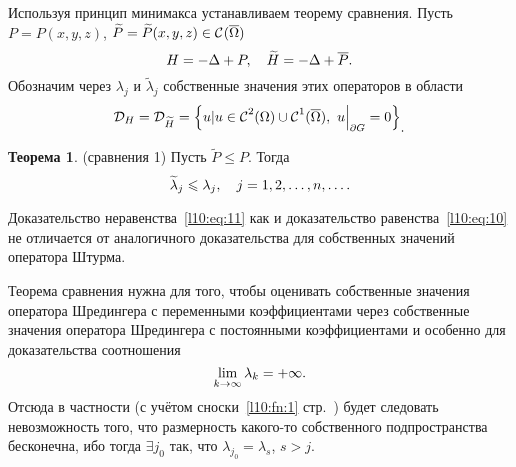 \documentclass[12pt,a4paper,openany,fleqn]{book}
\newcommand{\Cf}{\ensuremath{\mathcal{C}}}
\newcommand{\mc}[1]{\ensuremath{\mathcal{#1}}}
\newcommand{\Cfn}[2][]{\ensuremath{\Cf{\mathstrut}^{#2}_{#1}}}
\theoremstyle{definition}
\newtheorem{_teor}{Теорема}[section]
\begin{document}
	Используя принцип минимакса устанавливаем теорему сравнения. Пусть $P=P(x,y,z)$, $\widetilde{P}=\widetilde{P}(x,y,z)\in\Cfn{}(\overline{\Omega})$
	\begin{equation*}
		\hfill H=-\Delta+P,\quad \widetilde{H}=-\Delta+\overline{P}.\hfill
	\end{equation*}
	Обозначим через $\lambda_j$ и $\widetilde{\lambda}_j$ собственные значения этих операторов в области 
	\begin{equation*}
		\hfill\mc{D}_{H}=\mc{D}_{\widetilde{H}}=\left\{u|u\in\Cfn{2}(\Omega)\cup\Cfn{1}(\overline{\Omega}),\ u\Big|_{\partial G}=0\right\}_{\displaystyle.}\hfill
	\end{equation*}
	\begin{_teor}(сравнения 1)
		Пусть $\widetilde{P}\leqslant P$. Тогда 
		\begin{equation}\label{l10:eq:11}
			\hfill\widetilde{\lambda}_j\leqslant\lambda_j,\quad j=1,2,\ldots,n,\ldots.\hfill
		\end{equation}
	\end{_teor}
	Доказательство неравенства~\eqref{l10:eq:11} как и доказательство равенства~\eqref{l10:eq:10} не отличается от аналогичного доказательства для собственных значений оператора Штурма.
	
	Теорема сравнения нужна для того, чтобы оценивать собственные значения оператора Шредингера с переменными коэффициентами через собственные значения оператора Шредингера с постоянными коэффициентами и особенно для доказательства соотношения
	\begin{equation*}
		\hfill\lim\limits_{k\to\infty}\lambda_k=+\infty.\hfill
	\end{equation*}
	Отсюда в частности (с учётом сноски~\ref{l10:fn:1} стр.~\pageref{l10:fn:1}) будет следовать невозможность того, что размерность какого-то собственного подпространства бесконечна, ибо тогда $\exists j_0$ так, что $\lambda_{j_0}=\lambda_s$, $s>j$.
	
\end{document}
